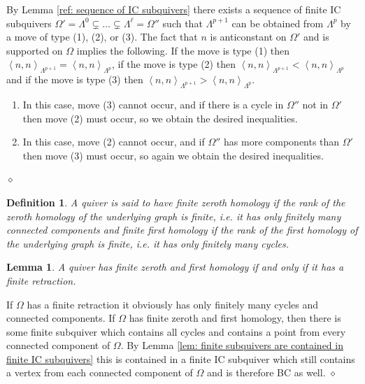 \documentclass{article}
\newcommand{\bracket}[1]{\left \langle #1 \right\rangle}
\newtheorem{lemma}{Lemma}[section]
\newtheorem{definition}{Definition}
\newenvironment{proof}{\vspace*{2ex}\noindent {\em Proof:}
}{\hfill $\diamond$ \\[2ex]}
\begin{document}
\begin{proof}
By Lemma \ref{ref: sequence of IC subquivers} there exists a sequence of finite IC subquivers $\Omega' = \Lambda^0 \subsetneq \ldots \subsetneq \Lambda^\ell =\Omega''$ such that $\Lambda^{p + 1}$ can be obtained from $\Lambda^p$ by a move of type (1), (2), or (3). The fact that $n$ is anticonstant on $\Omega'$ and is supported on $\Omega$ implies the following. If the move is type (1) then $\bracket{n , n}_{\Lambda^{p + 1}} = \bracket{n , n}_{\Lambda^{p}}$, if the move is type (2) then $\bracket{n , n}_{\Lambda^{p + 1}} < \bracket{n , n}_{\Lambda^{p}}$ and if the move is type (3) then $\bracket{n , n}_{\Lambda^{p + 1}} > \bracket{n , n}_{\Lambda^{p}}$.
    \begin{enumerate}
        \item In this case, move (3) cannot occur, and if there is a cycle in $\Omega''$ not in $\Omega'$ then move (2) must occur, so we obtain the desired inequalities. 
        \item In this case, move (2) cannot occur, and if $\Omega''$ has more components than $\Omega'$ then move (3) must occur, so again we obtain the desired inequalities. 
    \end{enumerate}
  \end{proof}

  

\begin{definition}
A quiver is said to have \emph{finite zeroth homology} if the rank of the zeroth homology of the underlying graph is finite, i.e.  it has only finitely many connected components and \emph{finite first homology} if the rank of the first homology of the underlying graph is finite, i.e. it has only finitely many cycles. 
\end{definition}



\begin{lemma}\label{lem: finite homology equals finite retraction}
    A quiver has finite zeroth and first homology if and only if it has a finite retraction. 
\end{lemma}

\begin{proof}
If $\Omega$ has a finite retraction it obviously has only finitely many cycles and connected components.  
If $\Omega$ has finite zeroth and first homology, then there is some finite subquiver which contains all cycles and contains a point from every connected component of $\Omega$. By Lemma \ref{lem: finite subquivers are contained in finite IC subquivers} this is contained in a finite IC subquiver which still contains a vertex from each connected component of $\Omega$ and is therefore BC as well. 
\end{proof}
\end{document}
